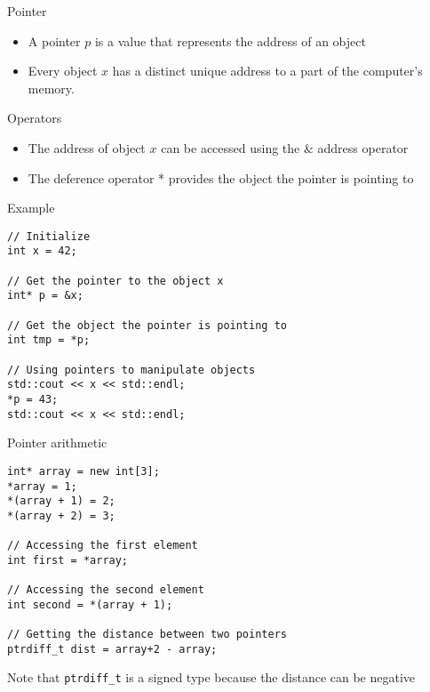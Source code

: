 \documentclass[\classoption]{beamer}
\begin{document}
\begin{frame}{Pointer}

\begin{center}

\end{center}
\begin{itemize}
\item A pointer $p$ is a value that represents the address of an object
\item Every object $x$ has a distinct unique address to a part of the computer's memory.
\end{itemize}

\begin{block}{Operators}
\begin{itemize}
\item The address of object $x$ can be accessed using the $\&$ address operator 
\item The deference operator * provides the object the pointer is pointing to
\end{itemize}
\end{block}

\end{frame}

\begin{frame}[fragile]{Example}

\begin{lstlisting}
// Initialize
int x = 42;

// Get the pointer to the object x
int* p = &x;

// Get the object the pointer is pointing to
int tmp = *p;

// Using pointers to manipulate objects
std::cout << x << std::endl;
*p = 43;
std::cout << x << std::endl;

\end{lstlisting}

\end{frame}

\begin{frame}[fragile]{Pointer arithmetic}

\begin{lstlisting}
int* array = new int[3];
*array = 1;
*(array + 1) = 2;
*(array + 2) = 3;

// Accessing the first element
int first = *array;

// Accessing the second element
int second = *(array + 1);

// Getting the distance between two pointers
ptrdiff_t dist = array+2 - array;
\end{lstlisting}

Note that \lstinline|ptrdiff_t| is a signed type because the distance can be negative
\end{frame}
\end{document}
